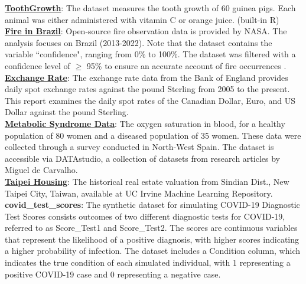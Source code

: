 \documentclass{article}\usepackage[]{graphicx}\usepackage[]{xcolor}
\numberwithin{equation}{section}
\begin{document}
\noindent
\href{https://www.rdocumentation.org/packages/datasets/versions/3.6.2/topics/ToothGrowth}{\textbf{ToothGrowth}}: The dataset measures the tooth growth of 60 guinea pigs. Each animal was either administered with vitamin C or orange juice.  \hfill (built-in R)\\

\noindent
\href{https://firms.modaps.eosdis.nasa.gov/}{\textbf{Fire in Brazil}}: Open-source fire observation data is provided by NASA. The analysis focuses on Brazil (2013-2022). Note that the dataset contains the variable ``confidence", ranging from 0\% to 100\%. The dataset was filtered with a confidence level of $\ge$ 95\%  to ensure an accurate account of fire occurrences \cite{nasa_confidence}.\\

\noindent
\href{https://www.bankofengland.co.uk/boeapps/database/index.asp?first=yes&SectionRequired=I&HideNums=-1&ExtraInfo=true&Travel=NIx}{\textbf{Exchange Rate}}: The exchange rate data from the Bank of England provides daily spot exchange rates against the pound Sterling from 2005 to the present. This report examines the daily spot rates of the Canadian Dollar, Euro, and US Dollar against the pound Sterling.\\

\noindent
\href{https://cloud.r-project.org/web/packages/DATAstudio/DATAstudio.pdf}{\textbf{Metabolic Syndrome Data}}: The oxygen saturation in blood, for a healthy population of 80 women and a diseased population of 35 women. These data were collected through a survey conducted in North-West Spain. The dataset is accessible via DATAstudio, a collection of datasets from research articles by Miguel de Carvalho.\\

\noindent
\href{https://archive.ics.uci.edu/dataset/477/real+estate+valuation+data+set}{\textbf{Taipei Housing}}: The historical real estate valuation from Sindian Dist., New Taipei City, Taiwan,  available at UC Irvine Machine Learning Repository.\\

\noindent
\textbf{covid\_test\_scores}: The synthetic dataset for simulating COVID-19 Diagnostic Test Scores consists outcomes of two different diagnostic tests for COVID-19, referred to as Score\_Test1 and Score\_Test2. The scores are continuous variables that represent the likelihood of a positive diagnosis, with higher scores indicating a higher probability of infection. The dataset includes a Condition column, which indicates the true condition of each simulated individual, with 1 representing a positive COVID-19 case and 0 representing a negative case.
\end{document}
